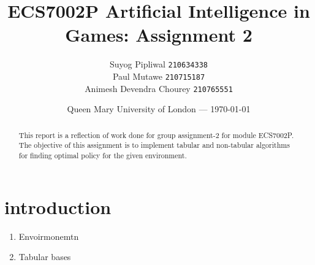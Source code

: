 \documentclass[11pt]{article}
\title{ECS7002P Artificial Intelligence in Games: Assignment 2} %
\author{Suyog Pipliwal \texttt{210634338}\\ 
			Paul Mutawe \texttt{210715187} \\ 
			Animesh Devendra Chourey \texttt{210765551}
} %
\date{Queen Mary University of London --- \today} %
\begin{document}
	\maketitle
\begin{abstract}
	This report is a reflection of work done for group assignment-2 for module ECS7002P. The objective of this assignment is to implement tabular and non-tabular algorithms for finding optimal policy for the given environment. 
\end{abstract}
\section{introduction}
	\begin{enumerate}
		\item Envoirmonemtn
		\item Tabular bases
			\
	\end{enumerate}
\end{document}

